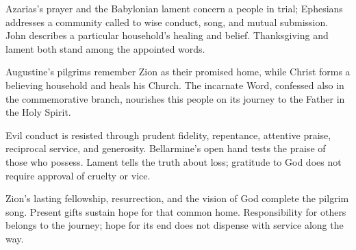 \begin{fourSenses}
\item[Literal.]
Azarias's prayer and the Babylonian lament concern a people in trial;
Ephesians addresses a community called to wise conduct, song, and mutual
submission. John describes a particular household's healing and belief.
Thanksgiving and lament both stand among the appointed words.
\item[Allegorical.]
Augustine's pilgrims remember Zion as their promised home, while Christ
forms a believing household and heals his Church. The incarnate Word,
confessed also in the commemorative branch, nourishes this people on its
journey to the Father in the Holy Spirit.
\item[Moral.]
Evil conduct is resisted through prudent fidelity, repentance,
attentive praise, reciprocal service, and generosity. Bellarmine's open
hand tests the praise of those who possess. Lament tells the truth about
loss; gratitude to God does not require approval of cruelty or vice.
\item[Anagogical.]
Zion's lasting fellowship, resurrection, and the vision of God complete
the pilgrim song. Present gifts sustain hope for that common home.
Responsibility for others belongs to the journey; hope for its end
does not dispense with service along the way.
\end{fourSenses}
